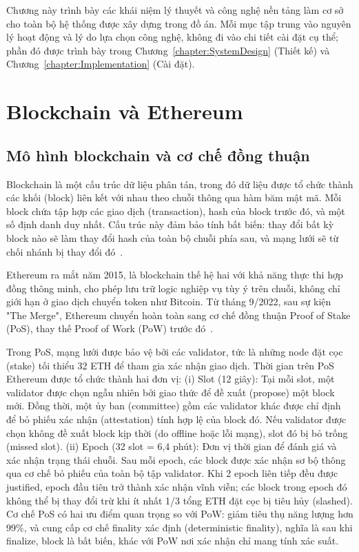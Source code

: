 \documentclass[../DoAn.tex]{subfiles}
\begin{document}
Chương này trình bày các khái niệm lý thuyết và công nghệ nền tảng làm cơ sở cho toàn bộ hệ thống được xây dựng trong đồ án. Mỗi mục tập trung vào nguyên lý hoạt động và lý do lựa chọn công nghệ, không đi vào chi tiết cài đặt cụ thể; phần đó được trình bày trong Chương~\ref{chapter:SystemDesign} (Thiết kế) và Chương~\ref{chapter:Implementation} (Cài đặt).

\section{Blockchain và Ethereum}
\label{section:3.1}


\subsection{Mô hình blockchain và cơ chế đồng thuận}
\label{section:3.1.1}


Blockchain là một cấu trúc dữ liệu phân tán, trong đó dữ liệu được tổ chức thành các khối (block) liên kết với nhau theo chuỗi thông qua hàm băm mật mã. Mỗi block chứa tập hợp các giao dịch (transaction), hash của block trước đó, và một số định danh duy nhất. Cấu trúc này đảm bảo tính bất biến: thay đổi bất kỳ block nào sẽ làm thay đổi hash của toàn bộ chuỗi phía sau, và mạng lưới sẽ từ chối nhánh bị thay đổi đó~\cite{EthereumWhitepaper,EthereumDocs}.

Ethereum ra mắt năm 2015, là blockchain thế hệ hai với khả năng thực thi hợp đồng thông minh, cho phép lưu trữ logic nghiệp vụ tùy ý trên chuỗi, không chỉ giới hạn ở giao dịch chuyển token như Bitcoin. Từ tháng 9/2022, sau sự kiện "The Merge", Ethereum chuyển hoàn toàn sang cơ chế đồng thuận Proof of Stake (PoS), thay thế Proof of Work (PoW) trước đó~\cite{EthereumDocs}.

Trong PoS, mạng lưới được bảo vệ bởi các validator, tức là những node đặt cọc (stake) tối thiểu 32 ETH để tham gia xác nhận giao dịch. Thời gian trên PoS Ethereum được tổ chức thành hai đơn vị: (i) Slot (12 giây): Tại mỗi slot, một validator được chọn ngẫu nhiên bởi giao thức để đề xuất (propose) một block mới. Đồng thời, một ủy ban (committee) gồm các validator khác được chỉ định để bỏ phiếu xác nhận (attestation) tính hợp lệ của block đó. Nếu validator được chọn không đề xuất block kịp thời (do offline hoặc lỗi mạng), slot đó bị bỏ trống (missed slot). (ii) Epoch (32 slot = 6,4 phút): Đơn vị thời gian để đánh giá và xác nhận trạng thái chuỗi. Sau mỗi epoch, các block được xác nhận sơ bộ thông qua cơ chế bỏ phiếu của toàn bộ tập validator. Khi 2 epoch liên tiếp đều được justified, epoch đầu tiên trở thành xác nhận vĩnh viễn; các block trong epoch đó không thể bị thay đổi trừ khi ít nhất 1/3 tổng ETH đặt cọc bị tiêu hủy (slashed). Cơ chế PoS có hai ưu điểm quan trọng so với PoW: giảm tiêu thụ năng lượng hơn 99\%, và cung cấp cơ chế finality xác định (deterministic finality), nghĩa là sau khi finalize, block là bất biến, khác với PoW nơi xác nhận chỉ mang tính xác suất.
\end{document}
